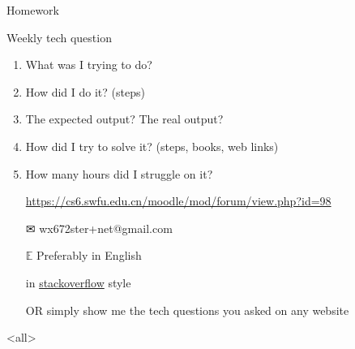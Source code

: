 \begin{frame}{{\hw\enspace}Homework}
  \begin{block}{Weekly tech question}
    \begin{enumerate}
    \item What was I trying to do?
    \item How did I do it? (steps)
    \item The expected output? The real output?
    \item How did I try to solve it? (steps, books, web links)
    \item How many hours did I struggle on it?
    \end{enumerate}
  \end{block}
  \begin{itemize}
  \item[\moodle] \url{https://cs6.swfu.edu.cn/moodle/mod/forum/view.php?id=98}
  \item[\Large\dejavu ✉] \alert{\ttfamily wx672ster+net@gmail.com}
  \item[$\mathbb{E}$] Preferably in English
  \item[\stackoverflow] in
    \href{https://stackoverflow.com/questions/39199299/what-is-the-essential-difference-between-compound-command-and-normal-command-inlink}{stackoverflow}
    style
  \item[OR] simply show me the tech questions you asked on any website
  \end{itemize}  
\end{frame}

\mode<all>
